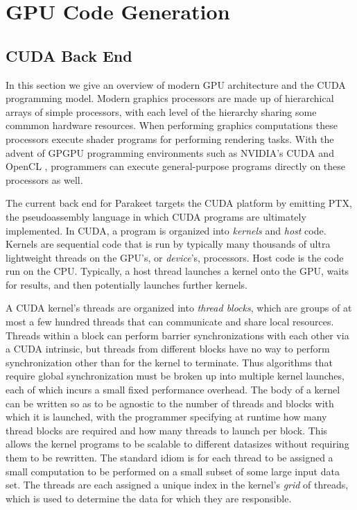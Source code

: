 \documentclass[preprint]{sigplanconf}
\begin{document}
\section{GPU Code Generation}
\subsection{CUDA Back End}

In this section we give an overview of modern GPU architecture and the CUDA
programming model.  Modern graphics processors are made up of hierarchical
arrays of simple processors, with each level of the hierarchy sharing some
commmon hardware resources.  When performing graphics computations these
processors execute shader programs for performing rendering tasks.  With the
advent of GPGPU programming environments such as NVIDIA's CUDA \cite{NvidCU} and
OpenCL \cite{Muns10}, programmers can execute general-purpose programs directly
on these processors as well.

The current back end for Parakeet targets the CUDA platform by emitting PTX, the
pseudoassembly language in which CUDA programs are ultimately implemented.
In CUDA, a program is organized into {\it kernels} and {\it host} code.
Kernels are sequential code that is run by typically many thousands of ultra
lightweight threads on the GPU's, or {\it device}'s, processors.  Host code is
the code run on the CPU. Typically, a host thread launches a kernel onto the
GPU, waits for results, and then potentially launches further kernels.

A CUDA kernel's threads are organized into {\it thread blocks}, which are groups
of at most a few hundred threads that can communicate and share local resources.
Threads within a block can perform barrier synchronizations with each other via
a CUDA intrinsic, but threads from different blocks have no way to perform
synchronization other than for the kernel to terminate.  Thus algorithms that
require global synchronization must be broken up into multiple kernel launches,
each of which incurs a small fixed performance overhead.  The body of a
kernel can be written so as to be agnostic to the number of threads and
blocks with which it is launched, with the programmer specifying at runtime how
many thread blocks are required and how many threads to launch per block. This
allows the kernel programs to be scalable to different datasizes without
requiring them to be rewritten. The standard idiom is for each thread to be
assigned a small computation to be performed on a small subset of some large
input data set.  The threads are each assigned a unique index in the kernel's
{\it grid} of threads, which is used to determine the data for which they are
responsible.
\end{document}
